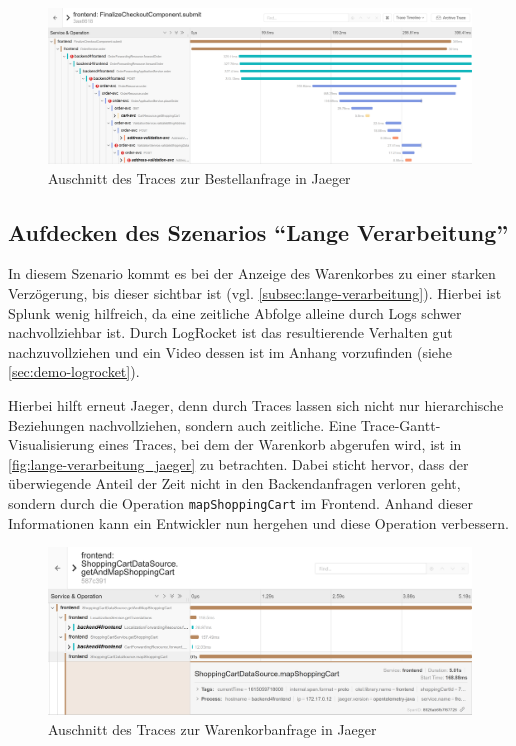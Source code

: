 \begin{figure}[H]
	\centering
	\includegraphics[width=1.00\linewidth]{img/05_ergebnis/ungueltige-adressen-sind-gueltig_jaeger-detail.png}
	\caption{Auschnitt des Traces zur Bestellanfrage in Jaeger}
	\label{fig:ungueltige-adressen-sind-gueltig_jaeger-detail}
\end{figure}

\subsection{Aufdecken des Szenarios \enquote{Lange Verarbeitung}}

In diesem Szenario kommt es bei der Anzeige des Warenkorbes zu einer starken Verzögerung, bis dieser sichtbar ist (vgl. \autoref{subsec:lange-verarbeitung}). Hierbei ist Splunk wenig hilfreich, da eine zeitliche Abfolge alleine durch Logs schwer nachvollziehbar ist. Durch LogRocket ist das resultierende Verhalten gut nachzuvollziehen und ein Video dessen ist im Anhang vorzufinden (siehe \autoref{sec:demo-logrocket}).

Hierbei hilft erneut Jaeger, denn durch Traces lassen sich nicht nur hierarchische Beziehungen nachvollziehen, sondern auch zeitliche. Eine Trace-Gantt-Visualisierung eines Traces, bei dem der Warenkorb abgerufen wird, ist in \autoref{fig:lange-verarbeitung_jaeger} zu betrachten. Dabei sticht hervor, dass der überwiegende Anteil der Zeit nicht in den Backendanfragen verloren geht, sondern durch die Operation \texttt{mapShoppingCart} im Frontend. Anhand dieser Informationen kann ein Entwickler nun hergehen und diese Operation verbessern.

\begin{figure}[H]
	\centering
	\includegraphics[width=1.00\linewidth]{img/05_ergebnis/lange-verarbeitung_jaeger.png}
	\caption{Auschnitt des Traces zur Warenkorbanfrage in Jaeger}
	\label{fig:lange-verarbeitung_jaeger}
\end{figure}